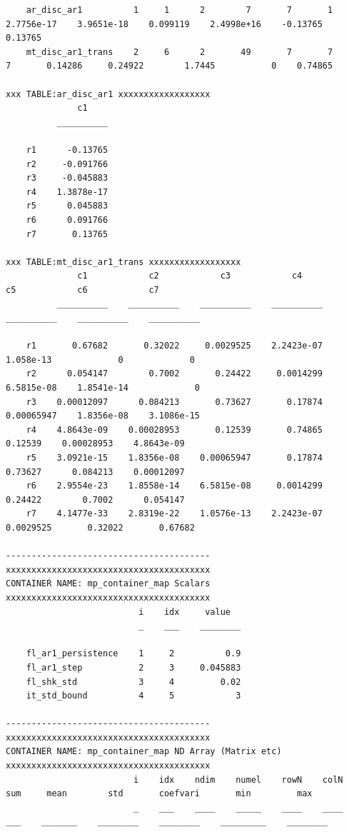 \documentclass[
]{book}
\begin{document}
\begin{verbatim}
    ar_disc_ar1          1     1      2        7       7       1      2.7756e-17    3.9651e-18    0.099119    2.4998e+16    -0.13765    0.13765
    mt_disc_ar1_trans    2     6      2       49       7       7               7       0.14286     0.24922        1.7445           0    0.74865

xxx TABLE:ar_disc_ar1 xxxxxxxxxxxxxxxxxx
              c1    
          __________

    r1      -0.13765
    r2     -0.091766
    r3     -0.045883
    r4    1.3878e-17
    r5      0.045883
    r6      0.091766
    r7       0.13765

xxx TABLE:mt_disc_ar1_trans xxxxxxxxxxxxxxxxxx
              c1            c2            c3            c4            c5            c6            c7    
          __________    __________    __________    __________    __________    __________    __________

    r1       0.67682       0.32022     0.0029525    2.2423e-07     1.058e-13             0             0
    r2      0.054147        0.7002       0.24422     0.0014299    6.5815e-08    1.8541e-14             0
    r3    0.00012097      0.084213       0.73627       0.17874    0.00065947    1.8356e-08    3.1086e-15
    r4    4.8643e-09    0.00028953       0.12539       0.74865       0.12539    0.00028953    4.8643e-09
    r5    3.0921e-15    1.8356e-08    0.00065947       0.17874       0.73627      0.084213    0.00012097
    r6    2.9554e-23    1.8558e-14    6.5815e-08     0.0014299       0.24422        0.7002      0.054147
    r7    4.1477e-33    2.8319e-22    1.0576e-13    2.2423e-07     0.0029525       0.32022       0.67682

----------------------------------------
xxxxxxxxxxxxxxxxxxxxxxxxxxxxxxxxxxxxxxxx
CONTAINER NAME: mp_container_map Scalars
xxxxxxxxxxxxxxxxxxxxxxxxxxxxxxxxxxxxxxxx
                          i    idx     value  
                          _    ___    ________

    fl_ar1_persistence    1     2          0.9
    fl_ar1_step           2     3     0.045883
    fl_shk_std            3     4         0.02
    it_std_bound          4     5            3

----------------------------------------
xxxxxxxxxxxxxxxxxxxxxxxxxxxxxxxxxxxxxxxx
CONTAINER NAME: mp_container_map ND Array (Matrix etc)
xxxxxxxxxxxxxxxxxxxxxxxxxxxxxxxxxxxxxxxx
                         i    idx    ndim    numel    rowN    colN    sum     mean        std       coefvari       min         max   
                         _    ___    ____    _____    ____    ____    ___    _______    ________    ________    _________    ________


\end{verbatim}
\end{document}
